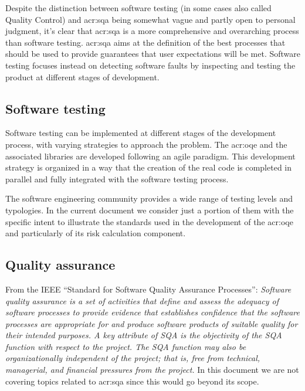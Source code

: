 Despite the distinction between software testing (in some cases also called Quality Control) and \gls{acr:sqa} being somewhat vague and partly open to personal judgment, it's clear that \gls{acr:sqa} is a more comprehensive and overarching process than software testing.
%
\gls{acr:sqa} aims at the definition of the best processes that should be used to provide guarantees that user expectations will be met.
%
Software testing focuses instead on detecting software faults by inspecting and testing the product at different stages of development.

\subsection{Software testing}
Software testing can be implemented at different stages of the development process, with varying strategies to approach the problem.
%
The \gls{acr:oqe} and the associated libraries are developed following an agile paradigm. This development strategy is organized in a way that the creation of the real code is completed in parallel and fully integrated with the software testing process.

The software engineering community provides a wide range of testing levels
and typologies. In the current document we consider just a portion of them
with the specific intent to illustrate the standards used in the development of the \gls{acr:oqe} and particularly of its risk calculation component.

\subsection{Quality assurance}
From the IEEE ``Standard for Software Quality Assurance Processes'':
\emph{Software quality assurance is a set of activities that define and assess the adequacy of software processes to provide evidence that establishes confidence that the software processes are appropriate for and produce software products of suitable quality for their intended purposes. A key attribute of SQA is the objectivity of the SQA function with respect to the project. The SQA function may also be organizationally independent of the project; that is, free from technical, managerial, and financial pressures from the project.} In this document we are not covering topics related to \gls{acr:sqa} since this would go beyond its scope.